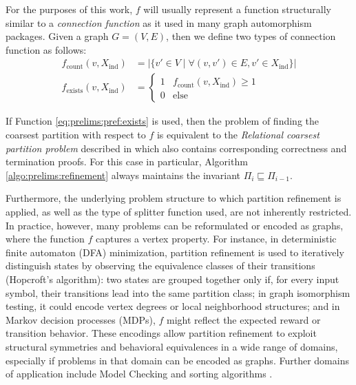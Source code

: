 		For the purposes of this work, $f$ will usually represent a function structurally similar to a \textit{connection function} as it used in many graph automorphism packages.
		Given a graph $G = (V, E)$, then we define two types of connection function as follows:
		\begin{align}
			f_{\mathrm{count}}(v, X_{\mathrm{ind}}) &= \left| \{ v' \in V \mid \forall (v, v') \in E, v' \in X_{\mathrm{ind}} \} \right| \label{eq:prelims:pref:count} \\
			f_{\mathrm{exists}}(v, X_{\mathrm{ind}}) &= \begin{cases}
				1 & f_{\mathrm{count}}(v, X_{\mathrm{ind}}) \geq 1 \label{eq:prelims:pref:exists} \\
				0 & \mathrm{else}
			\end{cases}
		\end{align}
		
		If Function \ref{eq:prelims:pref:exists} is used, then the problem of finding the coarsest partition with respect to $f$ is equivalent to the \textit{Relational coarsest partition problem} described in  \cite{paigeThreePartitionRefinement1987} which also contains corresponding correctness and termination proofs.
		For this case in particular, Algorithm \ref{algo:prelims:refinement} always maintains the invariant $\Pi_i \sqsubseteq \Pi_{i-1}$.
		
		Furthermore, the underlying problem structure to which partition refinement is applied, as well as the type of splitter function used, are not inherently restricted. In practice, however, many problems can be reformulated or encoded as graphs, where the function $f$ captures a vertex property.
		For instance, in deterministic finite automaton (DFA) minimization, partition refinement is used to iteratively distinguish states by observing the equivalence classes of their transitions (Hopcroft's algorithm): two states are grouped together only if, for every input symbol, their transitions lead into the same partition class; in graph isomorphism testing, it could encode vertex degrees or local neighborhood structures; and in Markov decision processes (MDPs), $f$ might reflect the expected reward or transition behavior.
		These encodings allow partition refinement to exploit structural symmetries and behavioral equivalences in a wide range of domains, especially if problems in that domain can be encoded as graphs. 
		Further domains of application include Model Checking \cite{baierPrinciplesModelChecking2008} and sorting algorithms \cite{mehlhornAlgorithmsDataStructures2008}.
	
